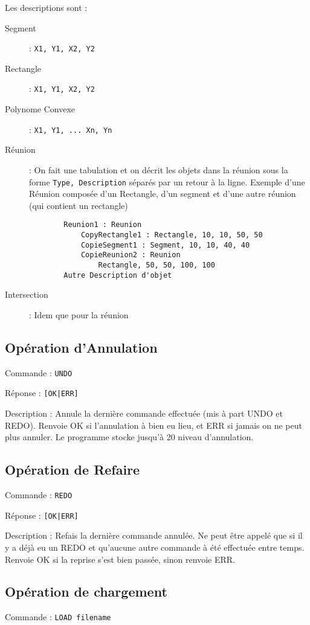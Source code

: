 \documentclass[11pt]{article}
\begin{document}
Les descriptions sont :
\begin{description}
	\item[Segment] : \texttt{X1, Y1, X2, Y2}
	\item[Rectangle] : \texttt{X1, Y1, X2, Y2}
	\item[Polynome Convexe] : \texttt{X1, Y1, ... Xn, Yn}
	\item[Réunion] : On fait une tabulation et on décrit les objets dans la réunion sous la forme \texttt{Type, Description} séparés par un retour à la ligne.
	Exemple d'une Réunion composée d'un Rectangle, d'un segment et d'une autre réunion (qui contient un rectangle)
	\begin{verbatim}
		Reunion1 : Reunion
		    CopyRectangle1 : Rectangle, 10, 10, 50, 50
		    CopieSegment1 : Segment, 10, 10, 40, 40
		    CopieReunion2 : Reunion
		        Rectangle, 50, 50, 100, 100
		Autre Description d'objet
	\end{verbatim}
	\item[Intersection] : Idem que pour la réunion
\end{description}

\subsection{Opération d'Annulation}
Commande : \texttt{UNDO}

Réponse : \texttt{[OK|ERR]}

Description : 
Annule la dernière commande effectuée (mis à part UNDO et REDO). Renvoie OK si l'annulation à bien eu lieu, et ERR si jamais on ne peut plus annuler. Le programme stocke jusqu’à 20 niveau d'annulation.

\subsection{Opération de Refaire}
Commande : \texttt{REDO}

Réponse : \texttt{[OK|ERR]}

Description : 
Refais la dernière commande annulée. Ne peut être appelé que si il y a déjà eu un REDO et qu'aucune autre commande à été effectuée entre temps.
Renvoie OK si la reprise s'est bien passée, sinon renvoie ERR.

\subsection{Opération de chargement}
Commande : \texttt{LOAD filename}
\end{document}
